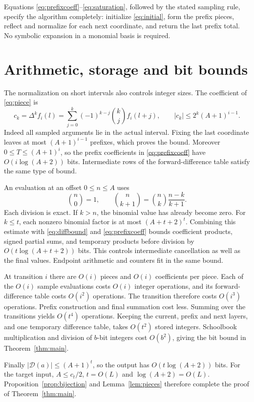 \documentclass[11pt]{article}
\theoremstyle{remark}
\newcommand{\card}[1]{\lvert #1\rvert}
\begin{document}
Equations \eqref{eq:prefixcoeff}--\eqref{eq:saturation}, followed by
the stated sampling rule, specify the algorithm completely: initialize
\eqref{eq:initial}, form the prefix pieces, reflect and normalize for
each next coordinate, and return the last prefix total. No symbolic
expansion in a monomial basis is required.

\section{Arithmetic, storage and bit bounds}

The normalization on short intervals also controls integer sizes.
The coefficient of \eqref{eq:piece} is
\begin{equation}\label{eq:diffbound}
 c_k=\Delta^k f_i(l)
 =\sum_{j=0}^k(-1)^{k-j}\binom kj f_i(l+j),\qquad
 |c_k|\leq 2^k(A+1)^{i-1}.
\end{equation}
Indeed all sampled arguments lie in the actual interval. Fixing the
last coordinate leaves at most $(A+1)^{i-1}$ prefixes, which proves
the bound. Moreover $0\leq T\leq(A+1)^i$, so the prefix coefficients
in \eqref{eq:prefixcoeff} have $O(i\log(A+2))$ bits. Intermediate
rows of the forward-difference table satisfy the same type of bound.

An evaluation at an offset $0\leq n\leq A$ uses
\[
 \binom n0=1,\qquad
 \binom n{k+1}=\binom nk\frac{n-k}{k+1}.
\]
Each division is exact. If $k>n$, the binomial value has already become
zero. For $k\leq t$, each nonzero binomial factor is at most
$(A+t+2)^t$. Combining this estimate with \eqref{eq:diffbound}
and \eqref{eq:prefixcoeff} bounds coefficient products, signed partial
sums, and temporary products before division by
$O(t\log(A+t+2))$ bits. This controls intermediate cancellation as
well as the final values. Endpoint arithmetic and counters fit in
the same bound.

At transition $i$ there are $O(i)$ pieces and $O(i)$ coefficients
per piece. Each of the $O(i)$ sample evaluations costs $O(i)$ integer
operations, and its forward-difference table costs $O(i^2)$ operations.
The transition therefore costs $O(i^3)$ operations. Prefix construction
and final summation cost less. Summing over the transitions yields
$O(t^4)$ operations. Keeping the current, prefix and next layers, and
one temporary difference table, takes $O(t^2)$ stored integers.
Schoolbook multiplication and division of $b$-bit integers cost
$O(b^2)$, giving the bit bound in Theorem~\ref{thm:main}.

Finally $\card{\mathcal D(a)}\leq(A+1)^t$, so the output has
$O(t\log(A+2))$ bits. For the target input,
$A\leq c_t/2$, $t=O(L)$ and $\log(A+2)=O(L)$.
Proposition~\ref{prop:bijection} and Lemma~\ref{lem:pieces} therefore
complete the proof of Theorem~\ref{thm:main}.
\end{document}
